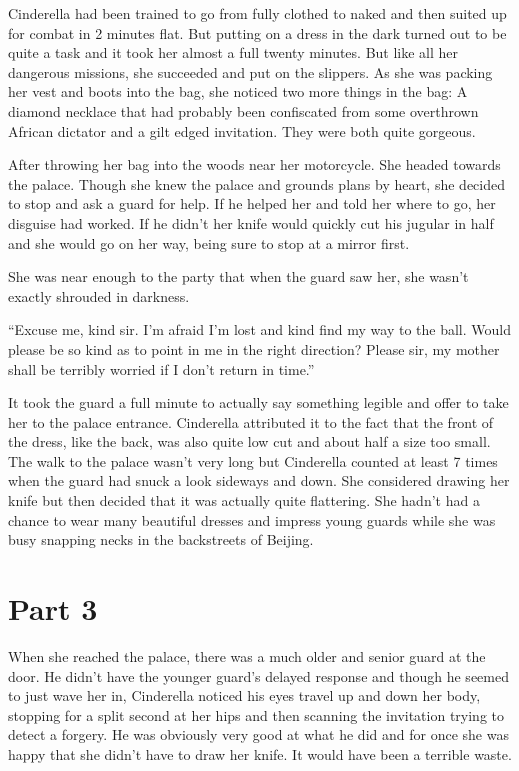 \documentclass[11pt,letterpaper]{article}
\begin{document}
Cinderella had been trained to go from fully clothed to naked and then suited up for combat in 2 minutes flat. But putting on a dress in the dark turned out to be quite a task and it took her almost a full twenty minutes. But like all her dangerous missions, she succeeded and put on the slippers. As she was packing her vest and boots into the bag, she noticed two more things in the bag: A diamond necklace that had probably been confiscated from some overthrown African dictator and a gilt edged invitation. They were both quite gorgeous.

After throwing her bag into the woods near her motorcycle. She headed towards the palace. Though she knew the palace and grounds plans by heart, she decided to stop and ask a guard for help. If he helped her and told her where to go, her disguise had worked. If he didn't her knife would quickly cut his jugular in half and she would go on her way, being sure to stop at a mirror first.

She was near enough to the party that when the guard saw her, she wasn't exactly shrouded in darkness.

``Excuse me, kind sir. I'm afraid I'm lost and kind find my way to the ball. Would please be so kind as to point in me in the right direction? Please sir, my mother shall be terribly worried if I don't return in time.''

It took the guard a full minute to actually say something legible and offer to take her to the palace entrance. Cinderella attributed it to the fact that the front of the dress, like the back, was also quite low cut and about half a size too small. The walk to the palace wasn't very long but Cinderella counted at least 7 times when the guard had snuck a look sideways and down. She considered drawing her knife but then decided that it was actually quite flattering. She hadn't had a chance to wear many beautiful dresses and impress young guards while she was busy snapping necks in the backstreets of Beijing.

\section*{Part 3}

When she reached the palace, there was a much older and senior guard at the door. He didn't have the younger guard's delayed response and though he seemed to just wave her in, Cinderella noticed his eyes travel up and down her body, stopping for a split second at her hips and then scanning the invitation trying to detect a forgery. He was obviously very good at what he did and for once she was happy that she didn't have to draw her knife. It would have been a terrible waste.
\end{document}
